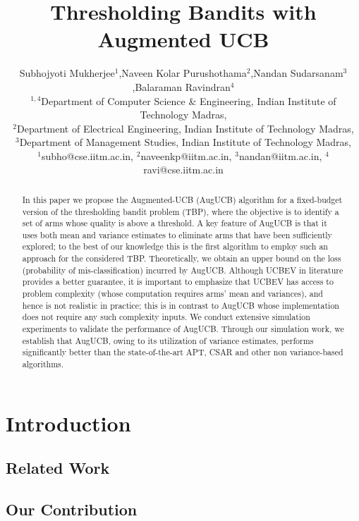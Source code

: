 \documentclass{article}
\title{Thresholding Bandits with Augmented UCB}
\author{\Large Subhojyoti Mukherjee${}^1$,Naveen Kolar Purushothama${}^2$,Nandan
Sudarsanam${}^3$,Balaraman Ravindran${}^4$ \\
\Large ${}^{1,4}$Department of Computer Science \& Engineering, Indian Institute of
Technology Madras, \\ 
\Large ${}^2$Department of Electrical Engineering, Indian Institute of
Technology Madras,\\
\Large ${}^3$Department of Management Studies, Indian Institute of
Technology Madras,
\\
\Large ${}^{1}$subho@cse.iitm.ac.in, ${}^{2}$naveenkp@iitm.ac.in, ${}^{3}$nandan@iitm.ac.in, ${}^{4}$ravi@cse.iitm.ac.in
}
\begin{document}
\maketitle


\vspace*{2mm}
\begin{abstract}
In this paper we propose the Augmented-UCB (AugUCB) algorithm for a fixed-budget version of the thresholding bandit problem (TBP), where the objective is to identify a set of arms whose quality is above a threshold. A key feature of AugUCB is that it uses both mean and variance estimates to eliminate arms that have been sufficiently explored; to the best of our knowledge this is the first algorithm to employ such an approach for the considered TBP.  Theoretically, we obtain an upper bound on the loss (probability of mis-classification) incurred by AugUCB. Although UCBEV in literature provides a better guarantee, it is important to emphasize that UCBEV has access to problem complexity (whose computation requires arms' mean and variances), and hence is not realistic in practice; this is in contrast to AugUCB whose implementation does not require any such complexity inputs. We conduct extensive simulation experiments to validate the performance of AugUCB. Through our simulation work, we establish that AugUCB, owing to its utilization of variance estimates, performs significantly better than the state-of-the-art APT, CSAR and other non variance-based algorithms.
\end{abstract}


\section{Introduction}
\label{intro}





\subsection{Related Work}
\label{prevRes}


\subsection{Our Contribution}
\label{contribution}

%
%
%
%
\vspace*{-1em}
\end{document}
